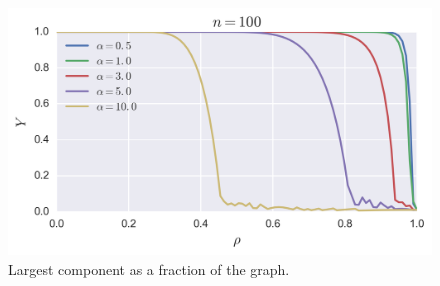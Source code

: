 \begin{figure}[tb]
	\centering
	\includegraphics[scale=1.]{figures/3_largest_component.png}
	\caption{Largest component as a fraction of the graph.}
	\label{fig:gnp_largest_component}
\end{figure}













